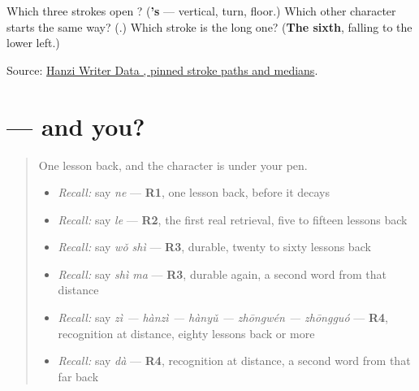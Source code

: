 \begin{tcolorbox}[breakable,colback=teal!4,colframe=teal!35!black,title={Before you move on}]
Which three strokes open ? (\textbf{'s} — vertical, turn, floor.) Which other character starts the same way? (\textbf{}.) Which stroke is the long one? (\textbf{The sixth}, falling to the lower left.)

Source: \href{https://raw.githubusercontent.com/chanind/hanzi-writer-data/68d10a4b21150cae5e1ebbd223eed289cf32d90c/data/\%E5\%91\%A2.json}{Hanzi Writer Data , pinned stroke paths and medians}.
\end{tcolorbox}
\section[\texorpdfstring{\zh{呢} (ne)}{呢 (ne)}]{ — and you?}

\label{lesson:ZH-C26-ne}



\begin{quote}
One lesson back, and the character is under your pen.

\begin{itemize}
\raggedright
  \item \emph{Recall:} say \emph{ne} — \textbf{R1}, one lesson back, before it decays
  \item \emph{Recall:} say \emph{le} — \textbf{R2}, the first real retrieval, five to fifteen lessons back
  \item \emph{Recall:} say \emph{wǒ shì} — \textbf{R3}, durable, twenty to sixty lessons back
  \item \emph{Recall:} say \emph{shì ma} — \textbf{R3}, durable again, a second word from that distance
  \item \emph{Recall:} say \emph{zì — hànzì — hànyǔ — zhōngwén — zhōngguó} — \textbf{R4}, recognition at distance, eighty lessons back or more
  \item \emph{Recall:} say \emph{dà} — \textbf{R4}, recognition at distance, a second word from that far back
\end{itemize}
\end{quote}

